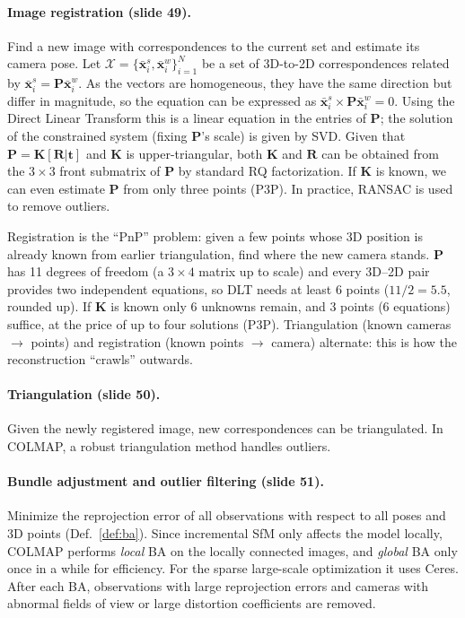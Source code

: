 \documentclass[11pt,a4paper]{article}
\begin{document}
\paragraph{Image registration (slide 49).} Find a new image with correspondences to the current set and estimate its camera pose. Let $\mathcal X=\{\bar{\bm x}^s_i,\bar{\bm x}^w_i\}_{i=1}^N$ be a set of 3D-to-2D correspondences related by $\bar{\bm x}^s_i=\bm P\bar{\bm x}^w_i$. As the vectors are homogeneous, they have the same direction but differ in magnitude, so the equation can be expressed as $\bar{\bm x}^s_i\times\bm P\bar{\bm x}^w_i=0$. Using the Direct Linear Transform this is a linear equation in the entries of $\bm P$; the solution of the constrained system (fixing $\bm P$'s scale) is given by SVD.
Given that $\bm P=\bm K[\bm R|\bm t]$ and $\bm K$ is upper-triangular, both $\bm K$ and $\bm R$ can be obtained from the $3\times3$ front submatrix of $\bm P$ by standard RQ factorization. If $\bm K$ is known, we can even estimate $\bm P$ from only three points (P3P). In practice, RANSAC is used to remove outliers.

\begin{intuition}
Registration is the ``PnP'' problem: given a few points whose 3D position is already known from earlier triangulation, find where the new camera stands. $\bm P$ has 11 degrees of freedom (a $3\times4$ matrix up to scale) and every 3D--2D pair provides two independent equations, so DLT needs at least 6 points ($11/2=5.5$, rounded up). If $\bm K$ is known only 6 unknowns remain, and 3 points (6 equations) suffice, at the price of up to four solutions (P3P). Triangulation (known cameras $\to$ points) and registration (known points $\to$ camera) alternate: this is how the reconstruction ``crawls'' outwards.
\end{intuition}

\paragraph{Triangulation (slide 50).} Given the newly registered image, new correspondences can be triangulated. In COLMAP, a robust triangulation method handles outliers.

\paragraph{Bundle adjustment and outlier filtering (slide 51).} Minimize the reprojection error of all observations with respect to all poses and 3D points (Def.~\ref{def:ba}). Since incremental SfM only affects the model locally, COLMAP performs \emph{local} BA on the locally connected images, and \emph{global} BA only once in a while for efficiency. For the sparse large-scale optimization it uses Ceres. After each BA, observations with large reprojection errors and cameras with abnormal fields of view or large distortion coefficients are removed.
\end{document}
